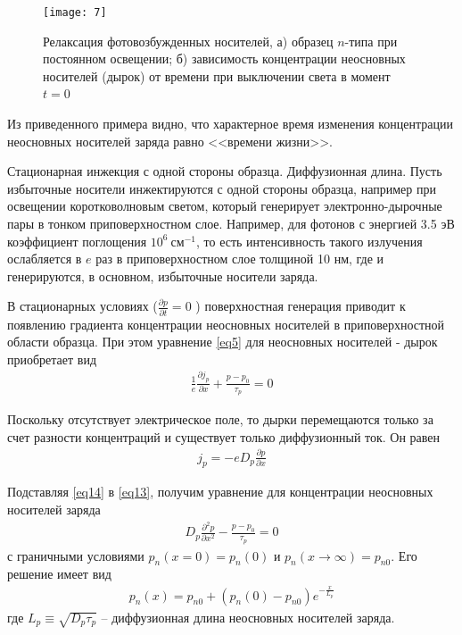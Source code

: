 \documentclass[a4paper,14pt]{extarticle}
\begin{document}
\begin{figure}[H]
	\centering
	\texttt{[image: 7]}
	\caption{Релаксация фотовозбужденных носителей, а) образец $n$-типа при постоянном освещении; б) зависимость концентрации неосновных носителей (дырок) от времени при выключении света в момент $t = 0$}
	\label{fig:figure6}
\end{figure}

Из приведенного примера видно, что характерное время изменения концентрации неосновных носителей заряда равно <<времени жизни>>.

Стационарная инжекция с одной стороны образца. Диффузионная длина. Пусть избыточные носители инжектируются с одной стороны образца, например при освещении коротковолновым светом, который генерирует электронно-дырочные пары в тонком приповерхностном слое. Например, для фотонов с энергией 3.5 эВ коэффициент поглощения $10^6\ \text{см}^{-1}$, то есть интенсивность такого излучения ослабляется в $e$ раз в приповерхностном слое толщиной 10 нм, где и генерируются, в основном, избыточные носители заряда.

В стационарных условиях ($\frac{\partial p}{\partial t}=0$ ) поверхностная генерация приводит к появлению градиента концентрации неосновных носителей в приповерхностной области образца. При этом уравнение \eqref{eq5} для неосновных носителей - дырок приобретает вид
\begin{gather}
	\label{eq13}
	\frac{1}{e} \frac{\partial j_{p}}{\partial x}+\frac{p-p_{0}}{\tau_{p}}=0
\end{gather}

Поскольку отсутствует электрическое поле, то дырки перемещаются только за счет разности концентраций и существует только диффузионный ток. Он равен
\begin{gather}
	\label{eq14}
	j_{p}=-e D_{p} \frac{\partial p}{\partial x}
\end{gather}

Подставляя \eqref{eq14} в \eqref{eq13}, получим уравнение для концентрации
неосновных носителей заряда
\begin{gather}
	\label{eq15}
	D_{p} \frac{\partial^{2} p}{\partial x^{2}}-\frac{p-p_{0}}{\tau_{p}}=0
\end{gather}
с граничными условиями $p_{n}(x=0)=p_{n}(0)$ и $p_{n}(x \rightarrow \infty)=p_{n 0}$. Его решение имеет вид
\begin{gather}
	\label{eq16}
	p_{n}(x)=p_{n 0}+\left(p_{n}(0)-p_{n 0}\right) e^{-\frac{x}{L_{p}}}
\end{gather}
где $L_{p} \equiv \sqrt{D_{p} \tau_{p}}$ -- диффузионная длина неосновных носителей заряда.
\end{document}
